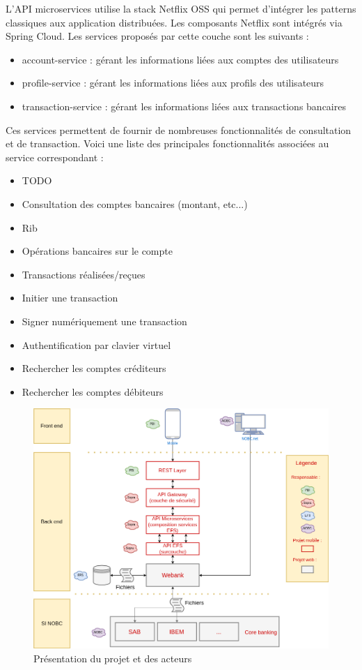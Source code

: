	L'API microservices utilise la stack Netflix OSS qui permet d'intégrer les patterns classiques aux application distribuées. Les composants Netflix sont intégrés via Spring Cloud. Les services proposés par cette couche sont les suivants :\\

\begin{itemize}
			\item account-service : gérant les informations liées aux comptes des utilisateurs
			\item profile-service : gérant les informations liées aux profils des utilisateurs
			\item transaction-service : gérant les informations liées aux transactions bancaires \\
\end{itemize}

	Ces services permettent de fournir de nombreuses fonctionnalités de consultation et de transaction. Voici une liste des principales fonctionnalités associées au service correspondant :
	\begin{itemize}
		\item TODO
		\item Consultation des comptes bancaires (montant, etc...)
		\item Rib
		\item Opérations bancaires sur le compte
		\item Transactions réalisées/reçues
		\item Initier une transaction
		\item Signer numériquement une transaction
		\item Authentification par clavier virtuel
		\item Rechercher les comptes créditeurs
		\item Rechercher les comptes débiteurs
	\end{itemize}

\begin{figure}[H]
\raggedleft
	\includegraphics[scale=0.45]{images/travailNeuflizeOBC/architecture/archiFonc.png}
	\centering
	\caption{Présentation du projet et des acteurs}
	\label{archiFonc}
\end{figure}

